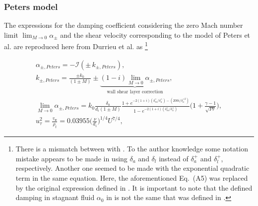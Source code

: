 \documentclass[12pt]{article}
\begin{document}
\subsubsection{Peters model}

The expressions for the damping coefficient considering the zero Mach number limit $\lim_{M \xrightarrow{}0} \alpha_{\pm}$ and the shear velocity corresponding to the model of Peters et al. are reproduced here from Durrieu et al. \cite{durrieu_2001} as \footnote{There is a mismatch between \cite[Eqs.~(4.1.46)~-~(4.1.48) in][]{weng_thesis} with \cite[Eqs.~(A1)~-~(A6) in][]{durrieu_2001}. To the author knowledge some notation mistake appears to be made in \cite[Eq.~(A5) in][]{durrieu_2001} using $\delta_a$ and  $\delta_l$ instead of $\delta_a^+$ and  $\delta_l^+$, respectively. Another one seemed to be made with the exponential quadratic term in the same equation. Here, the aforementioned Eq.~(A5) was replaced by the original expression defined in \cite[Eqs.~(4.1.47)~and~(17) respectively in][]{weng_thesis,peters_hirschberg_reijnen_wijnands_1993}. It is important to note that the defined damping in stagnant fluid $\alpha_0$ in \cite{durrieu_2001} is not the same that was defined in \cite{weng_thesis, peters_hirschberg_reijnen_wijnands_1993, peters_thesis}.}

\begin{gather} \label{eq:damping_coeff_peters}
	\alpha_{\pm, Peters} = - \mathcal{I}(\pm \, k_{\pm, Peters}), \\
	k_{\pm, Peters} = \frac{ \pm k_0 }{ (1 \pm M) }  \pm \underbrace{ (1- i)\lim_{M \xrightarrow{}0} \alpha_{\pm, Peters}}_\text{wall shear layer correction},  \\ 
	\lim_{M \xrightarrow{}0} \alpha_{\pm, Peters}  = k_0 \frac{ \delta_{a} }{ d_i (1 \pm M) } \frac{ 1 + e^{-2(1+ i)(\delta_{\text{vs}}^+ /\delta_{a}^+ ) - (200i /\delta_{a}^{+2} )} }{ 1 - e^{-2(1+ i)(\delta_{\text{vs}}^+ /\delta_{a}^+ )} } \Big( 1 + \frac{\gamma -1}{\sqrt{Pr}} \Big), \\ \label{eq:damping_coeff_peters_lowlimit}
	u_{\tau}^2 = \frac{\tau_{\text{w}}}{\rho_{\text{f}}} = 0.03955 \Big( \frac{\nu}{d_i} \Big)^{1/4} U^{7/4},    
\end{gather}

\end{document}
